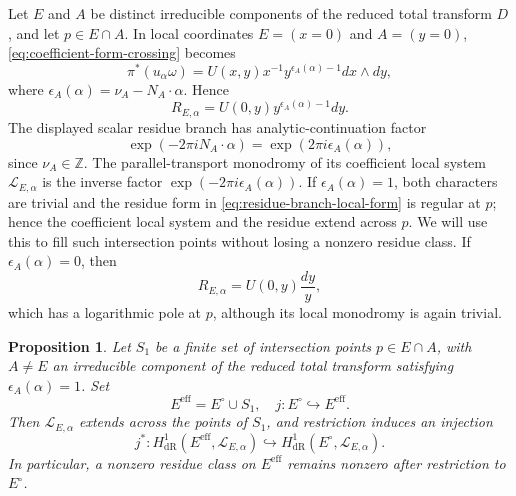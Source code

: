 \documentclass[12pt]{amsart}
\numberwithin{equation}{section}
\theoremstyle{plain}
\newtheorem{proposition}[theorem]{Proposition}
\theoremstyle{definition}
\theoremstyle{remark}
\theoremstyle{definition}
\newcommand{\Z}{\mathbb Z}
\newcommand{\Lcal}{\mathscr L}
\begin{document}
Let $E$ and $A$ be distinct irreducible components of the reduced total transform $D$, and let $p\in E\cap A$. In local coordinates $E=(x=0)$ and $A=(y=0)$, \eqref{eq:coefficient-form-crossing} becomes
\begin{equation}\label{eq:residue-one-local-form}
\pi^*(u_\alpha\omega)=U(x,y)x^{-1}y^{\epsilon_A(\alpha)-1}dx\wedge dy,
\end{equation}
where $\epsilon_A(\alpha)=\nu_A-N_A\cdot\alpha$. Hence
\begin{equation}\label{eq:residue-branch-local-form}
R_{E,\alpha}=U(0,y)y^{\epsilon_A(\alpha)-1}dy.
\end{equation}
The displayed scalar residue branch has analytic-continuation factor
\begin{equation}\label{eq:residue-branch-monodromy}
\exp(-2\pi iN_A\cdot\alpha)=\exp(2\pi i\epsilon_A(\alpha)),
\end{equation}
since $\nu_A\in\Z$. The parallel-transport monodromy of its coefficient local system $\Lcal_{E,\alpha}$ is the inverse factor $\exp(-2\pi i\epsilon_A(\alpha))$. If $\epsilon_A(\alpha)=1$, both characters are trivial and the residue form in \eqref{eq:residue-branch-local-form} is regular at $p$; hence the coefficient local system and the residue extend across $p$. We will use this to fill such intersection points without losing a nonzero residue class. If $\epsilon_A(\alpha)=0$, then
\begin{equation*}
R_{E,\alpha}=U(0,y)\frac{dy}{y},
\end{equation*}
which has a logarithmic pole at $p$, although its local monodromy is again trivial. 


\begin{proposition}\label{prop:residue-one-injection}
Let $S_1$ be a finite set of intersection points $p\in E\cap A$, with $A\neq E$ an irreducible component of the reduced total transform satisfying $\epsilon_A(\alpha)=1$. Set
\begin{equation*}
E^{\mathrm{eff}}=E^\circ\cup S_1,\quad j:E^\circ\hookrightarrow E^{\mathrm{eff}}.
\end{equation*}
Then $\Lcal_{E,\alpha}$ extends across the points of $S_1$, and restriction induces an injection
\begin{equation}\label{eq:residue-one-injection}
j^*:H^1_{\mathrm{dR}}(E^{\mathrm{eff}},\Lcal_{E,\alpha})\hookrightarrow H^1_{\mathrm{dR}}(E^\circ,\Lcal_{E,\alpha}).
\end{equation}
In particular, a nonzero residue class on $E^{\mathrm{eff}}$ remains nonzero after restriction to $E^\circ$.
\end{proposition}
\end{document}
